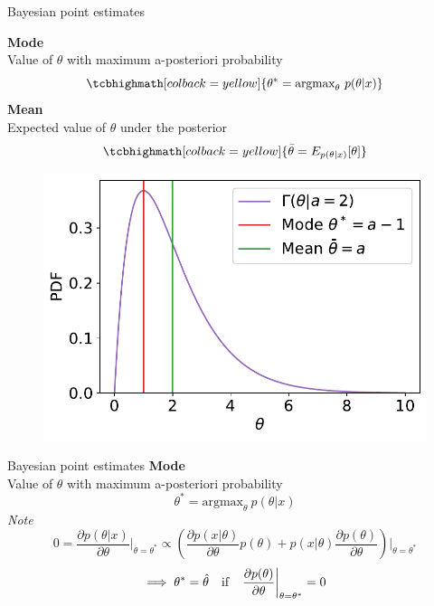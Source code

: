 \documentclass[
aspectratio=169,
14pt,
professionalfonts
]{beamer}
\begin{document}
\begin{frame}{Bayesian point estimates}
    \begin{minipage}{0.49\textwidth}
        \textbf{Mode}\\ Value of $\theta$ with maximum a-posteriori probability
            $$
            \tcbhighmath[colback=yellow]{
            \theta^* = \text{argmax}_\theta ~ p(\theta|x)
            }
            $$
        \textbf{Mean}\\ Expected value of $\theta$ under the posterior
            $$
            \tcbhighmath[colback=yellow]{ 
            \bar{\theta} = E_{p(\theta|x)}[\theta]
            }
            $$
    \end{minipage}
    \begin{minipage}{0.49\textwidth}
        \begin{figure}
            \centering
            \includegraphics[width=\linewidth]{../plots/map_vs_mean.pdf}
        \end{figure}
    \end{minipage}
\end{frame}

\begin{frame}{Bayesian point estimates}
        \textbf{Mode}\\ Value of $\theta$ with maximum a-posteriori probability
            $$\theta^* = \text{argmax}_\theta ~ p(\theta|x)$$
        \textit{Note}
        $$0=\frac{\partial p(\theta|x)}{\partial \theta}\bigg\vert_{\theta = \theta^*} \propto 
        \left(
            \frac{\partial p(x|\theta)}{\partial \theta}p(\theta) + p(x|\theta) \frac{\partial p(\theta)}{\partial \theta}\right)\bigg\vert_{\theta = \theta^*}$$
        $$\implies \theta^* = \hat \theta \quad {\rm if} \quad \frac{\partial p(\theta)}{\partial \theta}\bigg\vert_{\theta = \theta^*}=0$$
\end{frame}
\end{document}
